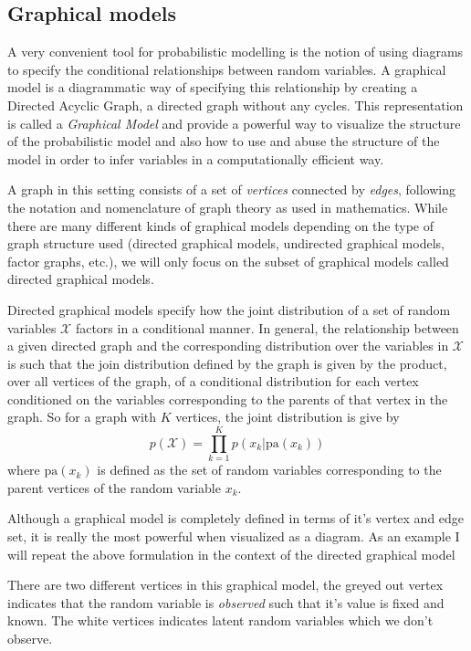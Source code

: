 \subsection{Graphical models}
A very convenient tool for probabilistic modelling is the notion of using
diagrams to specify the conditional relationships between random variables. A
graphical model is a diagrammatic way of specifying this relationship by
creating a Directed Acyclic Graph, a directed graph without any cycles. This
representation is called a \textit{Graphical Model} and provide a powerful way
to visualize the structure of the probabilistic model and also how to use and
abuse the structure of the model in order to infer variables in a
computationally efficient way.

A graph in this setting consists of a set of \textit{vertices} connected by
\textit{edges}, following the notation and nomenclature of graph theory as used
in mathematics. While there are many different kinds of graphical models
depending on the type of graph structure used (directed graphical models,
undirected graphical models, factor graphs, etc.), we will only focus on the
subset of graphical models called directed graphical models.

Directed graphical models specify how the joint distribution of a set of random
variables $\mathcal{X}$ factors in a conditional manner. In general, the
relationship between a given directed graph and the corresponding distribution
over the variables in $\mathcal{X}$ is such that the join distribution defined
by the graph is given by the product, over all vertices of the graph, of a
conditional distribution for each vertex conditioned on the variables
corresponding to the parents of that vertex in the graph. So for a graph with
$K$ vertices, the joint distribution is give by
\begin{equation}
  \label{eq:dir_graph_model_dist}
  p(\mathcal{X}) = \prod_{k=1}^K p(x_k | \text{pa}(x_k))
\end{equation}
where $\text{pa}(x_k)$ is defined as the set of random variables corresponding
to the parent vertices of the random variable $x_k$.

Although a graphical model is completely defined in terms of it's vertex and
edge set, it is really the most powerful when visualized as a diagram. As an
example I will repeat the above formulation in the context of the directed
graphical model
\begin{figure}[H]
  \center
\end{figure}
There are two different vertices in this graphical model, the greyed out vertex
indicates that the random variable is \textit{observed} such that it's value is
fixed and known. The white vertices indicates latent random variables which we
don't observe.

